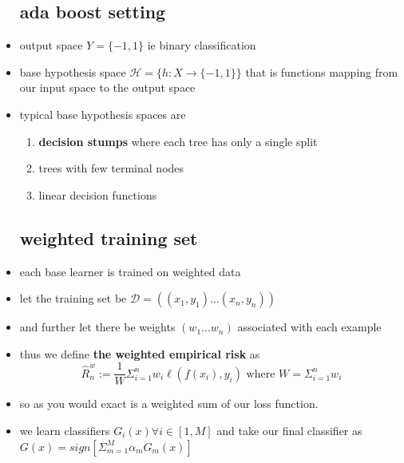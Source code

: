 \documentclass{article}
\begin{document}
\begin{itemize}
\subsection{ada boost setting}
\item output space $Y=\{-1,1\}$ ie binary classification 
\item base hypothesis space $\mathcal{H}=\{h:X\rightarrow \{-1,1\}\}$ that is functions mapping from our input space to the output space 
\item typical base hypothesis spaces are 
\begin{enumerate}
    \item \textbf{decision stumps} where each tree has only a single split 
    \item trees with few terminal nodes
    \item linear decision functions 
\end{enumerate}
\subsection{weighted training set}
\item each base learner is trained on weighted data 
\item let the training set be $\mathcal{D}=((x_1,y_1)...(x_n,y_n))$
\item and further let there be weights $(w_1...w_n)$ associated with each example
\item thus we define \textbf{ the weighted empirical risk} as $$\hat{R}_{n}^w:=\frac{1}{W}\Sigma_{i=1}^{n}w_i\ell(f(x_i),y_i) \text{ where } W=\Sigma_{i=1}^{n}w_i$$
\item so as you would exact is a weighted sum of our loss function. 
\item we learn classifiers $G_{i}(x)\forall i\in [1,M]$ and take our final classifier as $G(x)=sign[\Sigma_{m=1}^{M}\alpha_{m}G_m(x)]$ 

\end{itemize}
\end{document}
